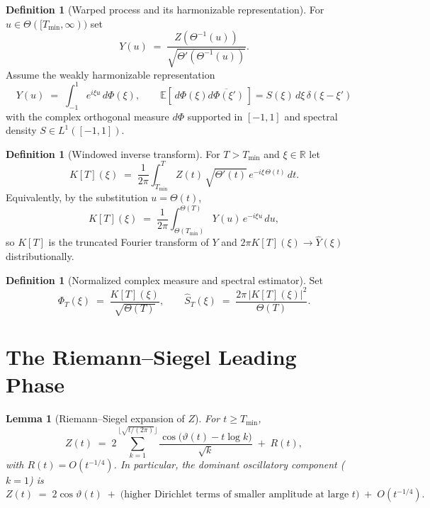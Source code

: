 \documentclass[11pt,a4paper]{article}
\theoremstyle{plain}
\newtheorem{lemma}[theorem]{Lemma}
\theoremstyle{definition}
\newtheorem{definition}[theorem]{Definition}
\newcommand{\R}{\mathbb{R}}
\begin{document}
\begin{definition}[Warped process and its harmonizable representation]
For $u\in\Theta([T_{\min},\infty))$ set
\[
Y(u) \;=\; \frac{Z(\Theta^{-1}(u))}{\sqrt{\Theta'(\Theta^{-1}(u))}} .
\]
Assume the weakly harmonizable representation
\begin{equation}\label{eq:harm}
Y(u) \;=\; \int_{-1}^{1} e^{i\xi u}\, d\Phi(\xi),\qquad \mathbb{E}[\,d\Phi(\xi)\overline{d\Phi(\xi')}\,]=S(\xi)\,d\xi\,\delta(\xi-\xi')
\end{equation}
with the complex orthogonal measure $d\Phi$ supported in $[-1,1]$ and spectral density $S\in L^1([-1,1])$.
\end{definition}

\begin{definition}[Windowed inverse transform]\label{def:K}
For $T>T_{\min}$ and $\xi\in\R$ let
\begin{equation}\label{eq:K}
K[T](\xi) \;=\; \frac{1}{2\pi}\int_{T_{\min}}^{T} Z(t)\,\sqrt{\Theta'(t)}\,e^{-i\xi\,\Theta(t)}\,dt .
\end{equation}
Equivalently, by the substitution $u=\Theta(t)$,
\[
K[T](\xi) \;=\; \frac{1}{2\pi}\int_{\Theta(T_{\min})}^{\Theta(T)} Y(u)\,e^{-i\xi u}\,du,
\]
so $K[T]$ is the truncated Fourier transform of $Y$ and $2\pi K[T](\xi)\to \widehat{Y}(\xi)$ distributionally.
\end{definition}

\begin{definition}[Normalized complex measure and spectral estimator]
Set
\[
\Phi_T(\xi)\;=\;\frac{K[T](\xi)}{\sqrt{\Theta(T)}},\qquad
\widehat{S}_T(\xi)\;=\;\frac{2\pi\,|K[T](\xi)|^2}{\Theta(T)} .
\]
\end{definition}

\section{The Riemann--Siegel Leading Phase}

\begin{lemma}[Riemann--Siegel expansion of $Z$]\label{lem:RS}
For $t\ge T_{\min}$,
\begin{equation}\label{eq:RS}
Z(t) \;=\; 2\sum_{k=1}^{\lfloor\sqrt{t/(2\pi)}\rfloor}\frac{\cos\!\bigl(\vartheta(t)-t\log k\bigr)}{\sqrt{k}} \;+\; R(t),
\end{equation}
with $R(t)=O(t^{-1/4})$. In particular, the dominant oscillatory component ($k=1$) is
\[
Z(t) \;=\; 2\cos\vartheta(t) \;+\; \text{(higher Dirichlet terms of smaller amplitude at large $t$)} \;+\; O(t^{-1/4}).
\]
\end{lemma}
\end{document}
